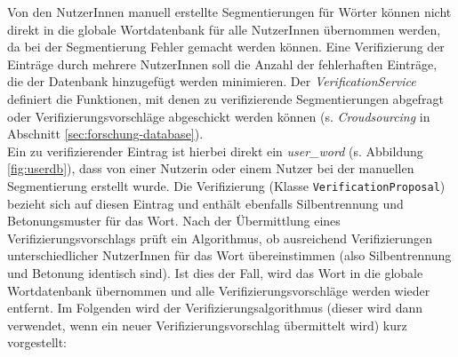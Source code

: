 Von den NutzerInnen manuell erstellte Segmentierungen für Wörter können nicht direkt in die globale Wortdatenbank für alle NutzerInnen übernommen werden, da bei der Segmentierung Fehler gemacht werden können. Eine Verifizierung der Einträge durch mehrere NutzerInnen soll die Anzahl der fehlerhaften Einträge, die der Datenbank hinzugefügt werden minimieren. Der \textit{VerificationService} definiert die Funktionen, mit denen zu verifizierende Segmentierungen abgefragt oder Verifizierungsvorschläge abgeschickt werden können (s. \textit{Croudsourcing} in Abschnitt \ref{sec:forschung-database}).\\
Ein zu verifizierender Eintrag ist hierbei direkt ein \textit{user\_word} (s. Abbildung \ref{fig:userdb}), dass von einer Nutzerin oder einem Nutzer bei der manuellen Segmentierung erstellt wurde. Die Verifizierung (Klasse \texttt{VerificationProposal}) bezieht sich auf diesen Eintrag und enthält ebenfalls Silbentrennung und Betonungsmuster für das Wort. Nach der Übermittlung eines Verifizierungsvorschlags prüft ein Algorithmus, ob ausreichend Verifizierungen unterschiedlicher NutzerInnen für das Wort übereinstimmen (also Silbentrennung und Betonung identisch sind). Ist dies der Fall, wird das Wort in die globale Wortdatenbank übernommen und alle Verifizierungsvorschläge werden wieder entfernt. Im Folgenden wird der Verifizierungsalgorithmus (dieser wird dann verwendet, wenn ein neuer Verifizierungsvorschlag übermittelt wird) kurz vorgestellt:

